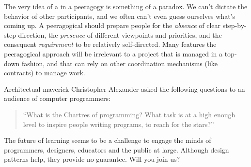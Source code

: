 The very idea of a  in a peeragogy is something
of a paradox.  We can't dictate the behavior of other participants,
and we often can't even guess ourselves what's coming up.  A
peeragogical  should prepare people for the
\emph{absence} of clear step-by-step direction, the \emph{presence} of
different viewpoints and priorities, and the consequent
\emph{requirement} to be relatively self-directed.  Many features the
peeragogical approach will be irrelevant to a project that is managed
in a top-down fashion, and that can rely on other coordination
mechanisms (like contracts) to manage work.

Architectual maverick Christopher Alexander asked the following
questions to an audience of computer programmers:
\begin{quote}
``What is the Chartres of programming? What task is at a high enough level to inspire people writing programs, to reach for the stars?'' \cite{alexander1999origins}
\end{quote}

The future of learning seems to be a challenge to engage the minds of
programmers, designers, educators and the public at large.  Although
design patterns help, they provide no guarantee.  Will you join us?


